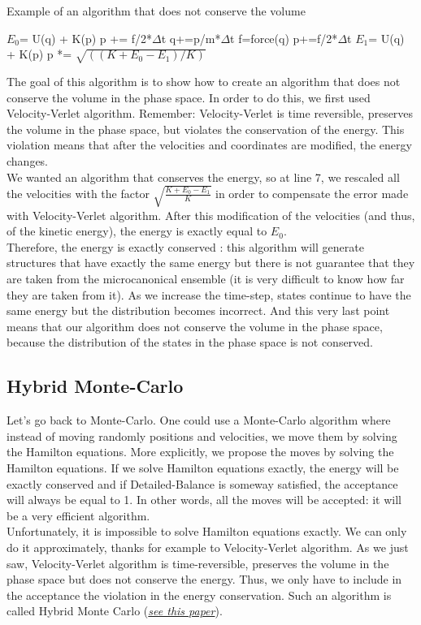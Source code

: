 \begin{algorithm}[H]
			\caption{Example of an algorithm that does not conserve the volume}
			\begin{algorithmic}[0]
				    \State $E_{0}$= U(q) + K(p)
					\State p += f/2*$\Delta$t
					\State q+=p/m*$\Delta$t
					\State f=force(q)
					\State 	p+=f/2*$\Delta$t 
					\State $E_{1}$= U(q) + K(p)
					\State p *= $\sqrt{((K+E_{0}-E_{1})/K)}$
				\EndFor
			\end{algorithmic}
\end{algorithm}
The goal of this algorithm is to show how to create an algorithm that does not conserve the volume in the phase space. In order to do this, we first used Velocity-Verlet algorithm. Remember: Velocity-Verlet is time reversible, preserves the volume in the phase space, but violates the conservation of the energy. This violation means that after the velocities and coordinates are modified, the energy changes. \\
We wanted an algorithm that conserves the energy, so at line 7, we rescaled all the velocities with the factor $\sqrt{\frac{K+E_{0}-E_{1}}{K}}$ in order to compensate the error made with Velocity-Verlet algorithm. After this modification of the velocities (and thus, of the kinetic energy), the energy is exactly equal to $E_{0}$. \\
Therefore, the energy is exactly conserved : this algorithm will generate structures that have exactly the same energy but there is not guarantee that they are taken from the microcanonical ensemble (it is very difficult to know how far they are taken from it). As we increase the time-step, states continue to have the same energy but the distribution becomes incorrect. And this very last point means that our algorithm does not conserve the volume in the phase space, because the distribution of the states in the phase space is not conserved. \\

\subsection{Hybrid Monte-Carlo}

Let's go back to Monte-Carlo. One could use a Monte-Carlo algorithm where instead of moving randomly positions and velocities, we move them by solving the Hamilton equations. More explicitly, we propose the moves by solving the Hamilton equations. If we solve Hamilton equations exactly, the energy will be exactly conserved and if Detailed-Balance is someway satisfied, the acceptance will always be equal to 1. In other words, all the moves will be accepted: it will be a very efficient algorithm. \\
Unfortunately, it is impossible to solve Hamilton equations exactly. We can only do it approximately, thanks for example to Velocity-Verlet algorithm. As we just saw, Velocity-Verlet algorithm is time-reversible, preserves the volume in the phase space but does not conserve the energy. Thus, we only have to include in the acceptance the violation in the energy conservation.
Such an algorithm is called Hybrid Monte Carlo (\href{https://www.sciencedirect.com/science/article/abs/pii/037026938791197X?}{\emph{see this paper}}).

